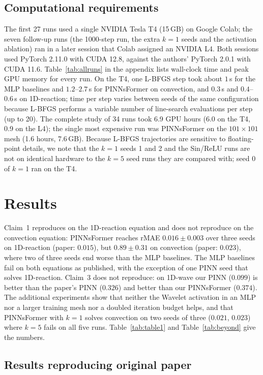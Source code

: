 \documentclass[10pt]{article} %
\begin{document}
\subsection{Computational requirements}
The first 27 runs used a single NVIDIA Tesla T4 (15\,GB) on Google Colab; the seven follow-up runs (the 1000-step run, the extra $k=1$ seeds and the activation ablation) ran in a later session that Colab assigned an NVIDIA L4. Both sessions used PyTorch 2.11.0 with CUDA 12.8, against the authors' PyTorch 2.0.1 with CUDA 11.6. Table~\ref{tab:allruns} in the appendix lists wall-clock time and peak GPU memory for every run. On the T4, one L-BFGS step took about $1$\,s for the MLP baselines and $1.2$--$2.7$\,s for PINNsFormer on convection, and $0.3$\,s and $0.4$--$0.6$\,s on 1D-reaction; time per step varies between seeds of the same configuration because L-BFGS performs a variable number of line-search evaluations per step (up to 20). The complete study of 34 runs took 6.9 GPU hours (6.0 on the T4, 0.9 on the L4); the single most expensive run was PINNsFormer on the $101\times101$ mesh (1.6 hours, 7.6\,GB). Because L-BFGS trajectories are sensitive to floating-point details, we note that the $k=1$ seeds 1 and 2 and the Sin/ReLU runs are not on identical hardware to the $k=5$ seed runs they are compared with; seed 0 of $k=1$ ran on the T4.

\section{Results}
\label{sec:results}
Claim~1 reproduces on the 1D-reaction equation and does not reproduce on the convection equation: PINNsFormer reaches rMAE $0.016\pm0.003$ over three seeds on 1D-reaction (paper: $0.015$), but $0.89\pm0.31$ on convection (paper: $0.023$), where two of three seeds end worse than the MLP baselines. The MLP baselines fail on both equations as published, with the exception of one PINN seed that solves 1D-reaction. Claim~3 does not reproduce: on 1D-wave our PINN ($0.099$) is better than the paper's PINN ($0.326$) and better than our PINNsFormer ($0.374$). The additional experiments show that neither the Wavelet activation in an MLP nor a larger training mesh nor a doubled iteration budget helps, and that PINNsFormer with $k=1$ solves convection on two seeds of three ($0.021$, $0.023$) where $k=5$ fails on all five runs. Table~\ref{tab:table1} and Table~\ref{tab:beyond} give the numbers.

\subsection{Results reproducing original paper}
\end{document}
